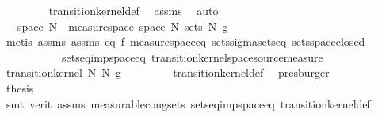 \begin{isabellebody}
\ \ \ \ \ \ \ \isamarkupfalse%
\ transition{\isacharunderscore}{\kern0pt}kernel{\isacharunderscore}{\kern0pt}def\ \isamarkupfalse%
\ assms\ \isamarkupfalse%
\ auto\isanewline
\ \ \ \ \ \isamarkupfalse%
\ \isamarkupfalse%
\ {\isachardoublequoteopen}{\isasymomega}\ {\isasymin}\ space\ N\ {\isasymLongrightarrow}\ measure{\isacharunderscore}{\kern0pt}space\ {\isacharparenleft}{\kern0pt}space\ N{\isacharprime}{\kern0pt}{\isacharparenright}{\kern0pt}\ {\isacharparenleft}{\kern0pt}sets\ N{\isacharprime}{\kern0pt}{\isacharparenright}{\kern0pt}\ {\isacharparenleft}{\kern0pt}g\ {\isasymomega}{\isacharparenright}{\kern0pt}{\isachardoublequoteclose}\ \ {\isasymomega}\isanewline
\ \ \ \ \ \ \ \isamarkupfalse%
\ {\isacharparenleft}{\kern0pt}metis\ assms{\isacharparenleft}{\kern0pt}{}{\isacharparenright}{\kern0pt}\ assms{\isacharparenleft}{\kern0pt}{}{\isacharparenright}{\kern0pt}\ eq\ f\ measure{\isacharunderscore}{\kern0pt}space{\isacharunderscore}{\kern0pt}eq\ sets{\isachardot}{\kern0pt}sigma{\isacharunderscore}{\kern0pt}sets{\isacharunderscore}{\kern0pt}eq\ sets{\isachardot}{\kern0pt}space{\isacharunderscore}{\kern0pt}closed\isanewline
\ \ \ \ \ \ \ \ \ \ \ sets{\isacharunderscore}{\kern0pt}eq{\isacharunderscore}{\kern0pt}imp{\isacharunderscore}{\kern0pt}space{\isacharunderscore}{\kern0pt}eq\ transition{\isacharunderscore}{\kern0pt}kernel{\isachardot}{\kern0pt}space{\isacharunderscore}{\kern0pt}source{\isacharunderscore}{\kern0pt}measure{\isacharparenright}{\kern0pt}\isanewline
\ \ \ \ \ \isamarkupfalse%
\ \isamarkupfalse%
\ {\isachardoublequoteopen}transition{\isacharunderscore}{\kern0pt}kernel\ N\ N{\isacharprime}{\kern0pt}\ g{\isachardoublequoteclose}\isanewline
\ \ \ \ \ \ \ \isamarkupfalse%
\ transition{\isacharunderscore}{\kern0pt}kernel{\isacharunderscore}{\kern0pt}def\ \isamarkupfalse%
\ presburger\isanewline
\ \ \isacommand{{\isacharbraceright}{\kern0pt}}\isamarkupfalse%
\isanewline
\ \ \isamarkupfalse%
\ \isamarkupfalse%
\ {\isacharquery}{\kern0pt}thesis\isanewline
\ \ \ \ \isamarkupfalse%
\ {\isacharparenleft}{\kern0pt}smt\ {\isacharparenleft}{\kern0pt}verit{\isacharparenright}{\kern0pt}\ assms\ measurable{\isacharunderscore}{\kern0pt}cong{\isacharunderscore}{\kern0pt}sets\ sets{\isacharunderscore}{\kern0pt}eq{\isacharunderscore}{\kern0pt}imp{\isacharunderscore}{\kern0pt}space{\isacharunderscore}{\kern0pt}eq\ transition{\isacharunderscore}{\kern0pt}kernel{\isacharunderscore}{\kern0pt}def{\isacharparenright}{\kern0pt}\isanewline

\end{isabellebody}
